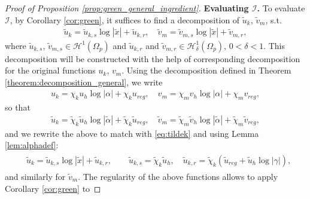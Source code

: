 \documentclass[report]{elsarticle}
\numberwithin{theorem}{section}
\begin{document}
\begin{proof}[Proof of Proposition \ref{prop:green_general_ingredient}]
\textbf{Evaluating $\mathcal{I}$. }	
	To evaluate $\mathcal{I}$, by Corollary \ref{cor:green}, it suffices to find a decomposition of $\widetilde{u}_k$, $\widetilde{v}_m$, s.t. 
	\begin{align}
		\label{eq:tildek}
		\widetilde{u}_k=\widetilde{u}_{k,s}\log|\tilde{x}|+\widetilde{u}_{k,r}, \quad		\widetilde{v}_m=\widetilde{v}_{m,s}\log|\tilde{x}|+\widetilde{v}_{m,r},
	\end{align}
where $\widetilde{u}_{k,s}$, $\widetilde{v}_{m,s}\in \mathcal{H}^1(\Omega_p)$ and $\widetilde{u}_{k,r}$ and $\widetilde{v}_{m,r}\in \mathcal{H}^1_{\delta}(\Omega_p)$, $0<\delta<1$. 
This decomposition will be constructed with the help of corresponding decomposition for the original functions $u_k, \, v_m$. Using the decomposition defined in Theorem  \ref{theorem:decomposition_general}, we write
	\begin{align*}
		u_k=\chi_k u_h\log|\alpha|+\chi_k u_{reg}, \quad v_m=\chi_m v_h\log|\alpha|+\chi_m v_{reg}, 
	\end{align*}
so that
	\begin{align*}
		\widetilde{u}_k=\widetilde{\chi}_k \widetilde{u}_h\log|\widetilde{\alpha}|+\widetilde{\chi}_k\widetilde{u}_{reg},\quad 	\widetilde{v}_m=\widetilde{\chi}_m \widetilde{v}_h\log|\widetilde{\alpha}|+\widetilde{\chi}_m\widetilde{v}_{reg},
	\end{align*}
	and we rewrite the above to match with \eqref{eq:tildek} and using Lemma \ref{lem:alphadef}:
	\begin{align}
		\label{eq:decomp_uk}
		\begin{split}
	&	\widetilde{u}_k=\widetilde{u}_{k,s}\log|\tilde{x}|+\widetilde{u}_{k,r}, \qquad	\widetilde{u}_{k,s}=\widetilde{\chi}_k\widetilde{u}_h, \quad \widetilde{u}_{k,r}=\widetilde{\chi}_k(\widetilde{u}_{reg}+\widetilde{u}_h\log|\gamma|),
	\end{split}
	\end{align}
and similarly for $\widetilde{v}_m$. The regularity of the above functions allows to apply Corollary \ref{cor:green} to

\end{proof}
\end{document}
